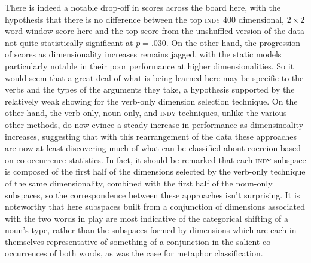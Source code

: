 There is indeed a notable drop-off in scores across the board here, with the hypothesis that there is no difference between the top \textsc{indy} 400 dimensional, $2 \times 2$ word window score here and the top score from the unshuffled version of the data not quite statistically significant at $p = .030$.  On the other hand, the progression of scores as dimensionality increases remains jagged, with the static models particularly notable in their poor performance at higher dimensionalities.  So it would seem that a great deal of what is being learned here may be specific to the verbs and the types of the arguments they take, a hypothesis supported by the relatively weak showing for the verb-only dimension selection technique.  On the other hand, the verb-only, noun-only, and \textsc{indy} techniques, unlike the various other methods, do now evince a steady increase in performance as dimensinoality increases, suggesting that with this rearrangement of the data these approaches are now at least discovering much of what can be classified about coercion based on co-occurrence statistics.  In fact, it should be remarked that each \textsc{indy} subspace is composed of the first half of the dimensions selected by the verb-only technique of the same dimensionality, combined with the first half of the noun-only subspaces, so the correspondence between these approaches isn't surprising.  It is noteworthy that here subspaces built from a conjunction of dimensions associated with the two words in play are most indicative of the categorical shifting of a noun's type, rather than the subspaces formed by dimensions which are each in themselves representative of something of a conjunction in the salient co-occurrences of both words, as was the case for metaphor classification.

